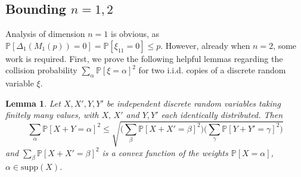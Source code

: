\documentclass[reqno]{amsart}
\numberwithin{equation}{section}
\newtheorem{lemma}[theorem]{Lemma}
\begin{document}
\subsection{Bounding $n =1,2$}

Analysis of dimension $n = 1$ is obvious, as $\mathbb{P}\left[\Delta_1(M_1(p)) = 0 \right] = \mathbb{P}\left[\xi_{11} = 0 \right] \le p$. However, already when $n = 2$, some work is required. First, we prove the following helpful lemmas regarding the collision probability $\sum_{\alpha} \mathbb{P}\left[ \xi = \alpha \right]^2$ for two i.i.d. copies of a discrete random variable $\xi$.

\begin{lemma}\label{lm:collision_prob}
Let $X, X',Y,Y'$ be independent discrete random variables taking finitely many values, with $X,\,X'$ and $Y,Y'$ each identically distributed. Then
\[\sum_{\alpha} \mathbb{P}\left[X+Y = \alpha\right]^2 \le \sqrt{\Big(\sum_{\beta} \mathbb{P}\left[X+X' = \beta\right]^2 \Big) \Big( \sum_{\gamma} \mathbb{P}\left[Y+Y' = \gamma\right]^2\Big)}\]
and $\sum_{\beta} \mathbb{P}\left[X+X' = \beta\right]^2$ is a convex function of the weights $\mathbb{P}[X= \alpha]$, $\alpha \in \mathrm{supp}(X)$.
\end{lemma}
\end{document}
